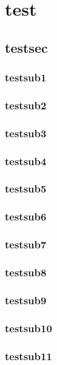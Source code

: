 \documentclass{ctexbook}
\begin{document}

\tableofcontents
\chapter{test}
\section{testsec}
\subsection{testsub1}
\subsection{testsub2}
\subsection{testsub3}
\subsection{testsub4}
\subsection{testsub5}
\subsection{testsub6}
\subsection{testsub7}
\subsection{testsub8}
\subsection{testsub9}
\subsection{testsub10}
\subsection{testsub11}
\end{document}

